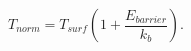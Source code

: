 \documentclass[12pt]{article}
\begin{document}
$$
	T_{norm} = T_{surf}\left(1 + \frac{E_{barrier}}{k_{b}}\right).
$$
\end{document}
